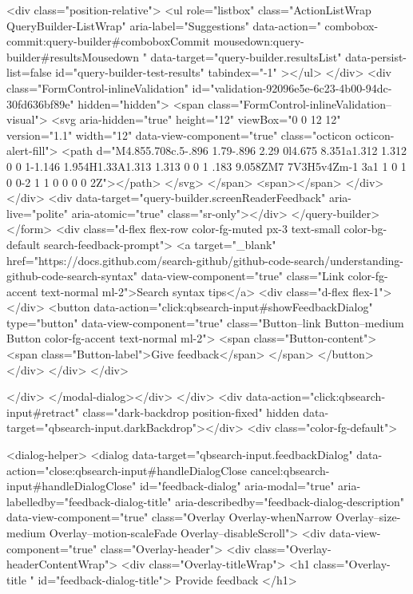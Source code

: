         <div class="position-relative">
                <ul
                  role="listbox"
                  class="ActionListWrap QueryBuilder-ListWrap"
                  aria-label="Suggestions"
                  data-action="
                    combobox-commit:query-builder#comboboxCommit
                    mousedown:query-builder#resultsMousedown
                  "
                  data-target="query-builder.resultsList"
                  data-persist-list=false
                  id="query-builder-test-results"
                  tabindex="-1"
                ></ul>
        </div>
      <div class="FormControl-inlineValidation" id="validation-92096e5e-6c23-4b00-94dc-30fd636bf89e" hidden="hidden">
        <span class="FormControl-inlineValidation--visual">
          <svg aria-hidden="true" height="12" viewBox="0 0 12 12" version="1.1" width="12" data-view-component="true" class="octicon octicon-alert-fill">
    <path d="M4.855.708c.5-.896 1.79-.896 2.29 0l4.675 8.351a1.312 1.312 0 0 1-1.146 1.954H1.33A1.313 1.313 0 0 1 .183 9.058ZM7 7V3H5v4Zm-1 3a1 1 0 1 0 0-2 1 1 0 0 0 0 2Z"></path>
</svg>
        </span>
        <span></span>
</div>    </div>
    <div data-target="query-builder.screenReaderFeedback" aria-live="polite" aria-atomic="true" class="sr-only"></div>
</query-builder></form>
          <div class="d-flex flex-row color-fg-muted px-3 text-small color-bg-default search-feedback-prompt">
            <a target="_blank" href="https://docs.github.com/search-github/github-code-search/understanding-github-code-search-syntax" data-view-component="true" class="Link color-fg-accent text-normal ml-2">Search syntax tips</a>            <div class="d-flex flex-1"></div>
              <button data-action="click:qbsearch-input#showFeedbackDialog" type="button" data-view-component="true" class="Button--link Button--medium Button color-fg-accent text-normal ml-2">  <span class="Button-content">
    <span class="Button-label">Give feedback</span>
  </span>
</button>
          </div>
        </div>
</div>

    </div>
</modal-dialog></div>
  </div>
  <div data-action="click:qbsearch-input#retract" class="dark-backdrop position-fixed" hidden data-target="qbsearch-input.darkBackdrop"></div>
  <div class="color-fg-default">
    
<dialog-helper>
  <dialog data-target="qbsearch-input.feedbackDialog" data-action="close:qbsearch-input#handleDialogClose cancel:qbsearch-input#handleDialogClose" id="feedback-dialog" aria-modal="true" aria-labelledby="feedback-dialog-title" aria-describedby="feedback-dialog-description" data-view-component="true" class="Overlay Overlay-whenNarrow Overlay--size-medium Overlay--motion-scaleFade Overlay--disableScroll">
    <div data-view-component="true" class="Overlay-header">
  <div class="Overlay-headerContentWrap">
    <div class="Overlay-titleWrap">
      <h1 class="Overlay-title " id="feedback-dialog-title">
        Provide feedback
      </h1>
        
